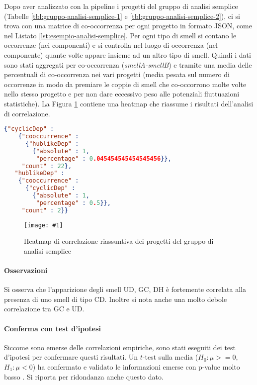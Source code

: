 \documentclass[a4paper,11pt,oneside, table]{article}
\newcommand{\putimage}[4] {
  \begin{figure}[H]
    \centering
    \texttt{[image: \#1]}
    \caption{#2}\label{#3}
  \end{figure}
}
\begin{document}
  Dopo aver analizzato con la pipeline i progetti del gruppo di analisi semplice (Tabelle \ref{tbl:gruppo-analisi-semplice-1} e \ref{tbl:gruppo-analisi-semplice-2}), ci si trova con una matrice di co-occorrenza per ogni progetto in formato JSON, come nel Listato \ref{lst:esempio-analisi-semplice}. Per ogni tipo di smell si contano le occorrenze (nei componenti) e si controlla nel luogo di occorrenza (nel componente) quante volte appare insieme ad un altro tipo di smell. Quindi i dati sono stati aggregati per co-occorrenza (\textit{smellA-smellB}) e tramite una media delle percentuali di co-occorrenza nei vari progetti (media pesata sul numero di occorrenze in modo da premiare le coppie di smell che co-occorrono molte volte nello stesso progetto e per non dare eccessivo peso alle potenziali fluttuazioni statistiche). La Figura \ref{png:heatmap-simple-analysis} contiene una heatmap che riassume i risultati dell'analisi di correlazione.

  \begin{lstlisting}[language=json, caption={Esempio di JSON di analisi semplice del progetto apache/commons-validator}, label={lst:esempio-analisi-semplice}]
  {"cyclicDep" : 
    {"cooccurrence" : 
      {"hublikeDep" : 
        {"absolute" : 1,
         "percentage" : 0.045454545454545456}},
     "count" : 22},
   "hublikeDep" : 
    {"cooccurrence" : 
      {"cyclicDep" : 
        {"absolute" : 1,
         "percentage" : 0.5}},
     "count" : 2}}
  \end{lstlisting}

  \putimage{images/heatmap-simple-analysis.png}{Heatmap di correlazione riassuntiva dei progetti del gruppo di analisi semplice}{png:heatmap-simple-analysis}{0.5}

  \paragraph{Osservazioni}
  Si osserva che l'apparizione degli smell UD, GC, DH \`e fortemente correlata alla presenza di uno smell di tipo CD. Inoltre si nota anche una molto debole correlazione tra GC e UD.

  \paragraph{Conferma con test d'ipotesi}

  Siccome sono emerse delle correlazioni empiriche, sono stati eseguiti dei test d'ipotesi per confermare questi risultati. Un $t$-test \cite{sun2020microbiome} sulla media ($H_0: \mu >= 0$, $H_1: \mu < 0$) ha confermato e validato le informazioni emerse con p-value molto basso \cite{head2015extent}. Si riporta per ridondanza anche questo dato.
\end{document}
